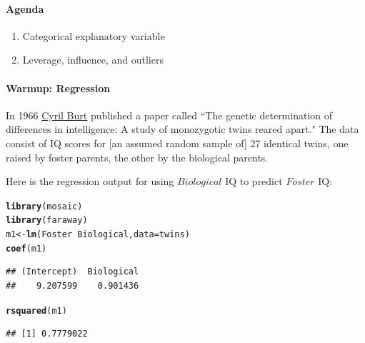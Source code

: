 \documentclass[10pt]{article}\usepackage[]{graphicx}\usepackage[]{color}
\makeatletter
\newcommand{\hlopt}[1]{\textcolor[rgb]{0,0,0}{#1}}%
\newcommand{\hlstd}[1]{\textcolor[rgb]{0.345,0.345,0.345}{#1}}%
\newcommand{\hlkwb}[1]{\textcolor[rgb]{0.69,0.353,0.396}{#1}}%
\newcommand{\hlkwc}[1]{\textcolor[rgb]{0.333,0.667,0.333}{#1}}%
\newcommand{\hlkwd}[1]{\textcolor[rgb]{0.737,0.353,0.396}{\textbf{#1}}}%
\newenvironment{kframe}{%
 \def\at@end@of@kframe{}%
 \ifinner\ifhmode%
  \def\at@end@of@kframe{\end{minipage}}%
  \begin{minipage}{\columnwidth}%
 \fi\fi%
 \def\FrameCommand##1{\hskip\@totalleftmargin \hskip-\fboxsep
 \colorbox{shadecolor}{##1}\hskip-\fboxsep
     \hskip-\linewidth \hskip-\@totalleftmargin \hskip\columnwidth}%
 \MakeFramed {\advance\hsize-\width
   \@totalleftmargin\z@ \linewidth\hsize
   \@setminipage}}%
 {\par\unskip\endMakeFramed%
 \at@end@of@kframe}
\newenvironment{knitrout}{}{} %
\makeatother
\begin{document}
\paragraph{Agenda}
\begin{enumerate}
  \itemsep0em
  \item Categorical explanatory variable
  \item Leverage, influence, and outliers
\end{enumerate}



\paragraph{Warmup: Regression}
In 1966 \href{http://en.wikipedia.org/wiki/Cyril_Burt}{Cyril Burt} published a paper called ``The genetic determination of differences in intelligence: A study of monozygotic twins reared apart." The data consist of IQ scores for [an assumed random sample of] 27 identical twins, one raised by foster parents, the other by the biological parents. 

Here is the regression output for using $Biological$ IQ to predict $Foster$ IQ:

\begin{knitrout}\footnotesize
{}\color{fgcolor}\begin{kframe}
\begin{alltt}
\hlkwd{library}\hlstd{(mosaic)}
\hlkwd{library}\hlstd{(faraway)}
\hlstd{m1} \hlkwb{<-} \hlkwd{lm}\hlstd{(Foster} \hlopt{~} \hlstd{Biological,} \hlkwc{data} \hlstd{= twins)}
\hlkwd{coef}\hlstd{(m1)}
\end{alltt}
\begin{verbatim}
## (Intercept)  Biological 
##    9.207599    0.901436
\end{verbatim}
\begin{alltt}
\hlkwd{rsquared}\hlstd{(m1)}
\end{alltt}
\begin{verbatim}
## [1] 0.7779022
\end{verbatim}
\end{kframe}
\end{knitrout}
\end{document}
